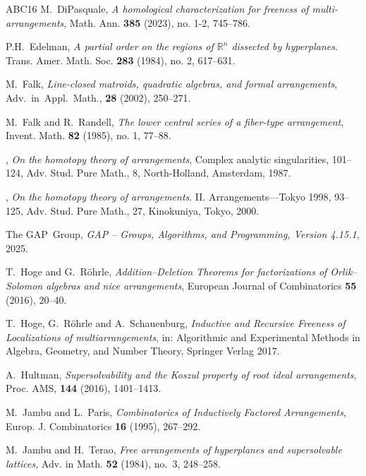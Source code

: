 \documentclass[12pt]{amsart}
\newcommand\BBR{{\mathbb R}}
\numberwithin{equation}{section}
\theoremstyle{plain}
\theoremstyle{definition}
\begin{document}
\begin{thebibliography}{ABC{\etalchar{+}}16}
M.~DiPasquale,
\emph{A homological characterization for freeness of multi-arrangements}, 
Math. Ann. \textbf{385} (2023), no. 1-2, 745--786.

P.H.~Edelman, 
\emph{A partial order on the regions of $\BBR^n$ 
	dissected by hyperplanes}. Trans. Amer. Math. Soc. \textbf{283} (1984), no. 2, 617--631. 

M.~Falk,
\emph{Line-closed matroids, quadratic algebras, and formal arrangements},
Adv.~in~Appl.~Math., \textbf{28} (2002), 250--271.

M.~Falk and R.~Randell,
\emph{The lower central series of a fiber-type arrangement},
Invent. Math. \textbf{82} (1985), no. 1, 77--88.

\bysame,
\emph{On the homotopy theory of arrangements},
Complex analytic singularities, 101--124,
Adv. Stud. Pure Math., 8, North-Holland, Amsterdam, 1987.

\bysame,
\emph{On the homotopy theory of arrangements}. II. Arrangements—Tokyo 1998, 93--125, Adv. Stud. Pure Math., 27, Kinokuniya, Tokyo, 2000.

The GAP~Group, \emph{{GAP -- Groups, Algorithms, and Programming, Version
		4.15.1}}, 2025.

T.~Hoge and G.~R\"ohrle,
\emph{Addition–Deletion Theorems for factorizations
	of Orlik–Solomon algebras and nice
	arrangements},
European Journal of Combinatorics
\textbf{55} (2016), 20--40.

	T.~Hoge, G.~R\"ohrle and A.~Schauenburg, 
	\emph{Inductive and Recursive Freeness of Localizations of 
		multiarrangements}, 
	in: Algorithmic and Experimental Methods in Algebra, Geometry, and Number Theory, Springer Verlag
	2017.

A.~Hultman,
\emph{Supersolvability and the Koszul property of root ideal arrangements},
 Proc. AMS, \textbf{144} (2016), 1401--1413.
\textbf{}

M.~Jambu and L.~Paris,
\emph{Combinatorics of Inductively Factored Arrangements},
Europ. J. Combinatorics \textbf{16} (1995), 267--292.

M.~Jambu and H.~Terao,
\emph{Free arrangements of hyperplanes and
	supersolvable lattices},
Adv. in Math. \textbf{52} (1984), no.~3, 248--258.


\end{thebibliography}
\end{document}
